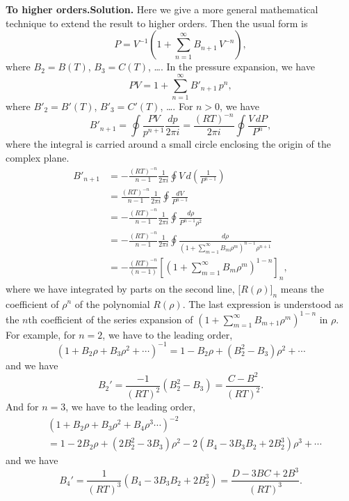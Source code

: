 \documentclass[twocolumn, 10pt]{article}
\numberwithin{equation}{section}
\newenvironment{solution}[1][\empty]
{\par\medskip
  \textbf{\ifx\empty#1{Solution.}\relax\else{#1}\fi} \ignorespaces}
{\medskip}
\begin{document}
\begin{solution}[To higher orders.]
  Here we give a more general mathematical technique
  to extend the result to higher orders.
  Then the usual form is
  $$
  P = V^{-1} \left(1 + \sum_{n=1}^\infty B_{n+1} \, V^{-n}\right),
  $$
  where $B_2 = B(T)$, $B_3 = C(T)$, \dots.
  In the pressure expansion, we have
  $$
  P V = 1 + \sum_{n=1}^\infty B'_{n+1} \, p^n,
  $$
  where $B'_2 = B'(T)$, $B'_3 = C'(T)$, \dots.
  For $n > 0$, we have
  $$
  B'_{n+1}
  =
  \oint \frac{ P V } { p^{n+1} } \frac{d p}{2\pi i}
  =\frac{(RT)^{-n}}{2\pi i}
  \oint \frac{ V \, d P } { P^n }
  ,
  $$
  where the integral is carried around a small circle
  enclosing the origin of the complex plane.
  \begin{align*}
    B'_{n+1}
    &= -\frac{(RT)^{-n}}{n-1}
    \frac{1}{2\pi i} \oint V \, d \left( \frac{ 1 } { P^{n-1} } \right)
    \\
    &= \frac{(RT)^{-n}}{n-1}
    \frac{1}{2\pi i} \oint \frac{ d V } { P^{n-1} }
    \\
    &= -\frac{(RT)^{-n}}{n-1}
    \frac{1}{2\pi i} \oint \frac{ d \rho } { P^{n-1} \rho^2 }
    \\
    &=
    -\frac{(RT)^{-n}}{n-1}
    \frac{1}{2\pi i} \oint
    \frac{ d \rho } { (1+\sum_{m=1}^\infty B_m \rho^m )^{n-1} \rho^{n+1} }
    \\
    &= -\frac{(RT)^{-n}}{(n-1)}
      \left[
        \left(1+\sum_{m=1}^\infty B_m \rho^m \right)^{1-n}
      \right]_n
    ,
  \end{align*}
  where
  we have integrated by parts on the second line,
  $\bigl[ R(\rho) \bigr]_n$
  means the coefficient of $\rho^n$ of the polynomial $R(\rho)$.
  The last expression is understood
  as the $n$th coefficient of the series expansion
  of $\left(1+\sum_{m=1}^\infty B_{m+1} \rho^m \right)^{1-n}$
  in $\rho$.
  For example, for $n = 2$, we have
  to the leading order,
  $$
  (1 + B_2 \rho + B_3 \rho^2 + \cdots)^{-1}
  =
  1 - B_2 \rho + (B_2^2 - B_3) \rho^2 + \cdots
  $$
  and we have
  $$
  B_2' = \frac{-1}{(RT)^2} (B_2^2 - B_3)
  = \frac{ C - B^2 } { (RT)^2 }.
  $$
  And for $n = 3$, we have
  to the leading order,
  \begin{align*}
  &\left( 1 + B_2 \rho + B_3 \rho^2 + B_4 \rho^3 \cdots \right)^{-2}
  \\
  &=
  1 - 2 B_2 \rho + (2 B_2^2 - 3 B_3) \rho^2
    - 2 (B_4 - 3 B_3 B_2 + 2B_2^3) \rho^3
    + \cdots
  \end{align*}
  and we have
  $$
  B_4' = \frac{1}{(RT)^3} (B_4 - 3 B_3 B_2 + 2 B_2^3)
  = \frac{ D - 3 B C + 2 B^3 } { (RT)^3 }.
  $$
\end{solution}
\end{document}
